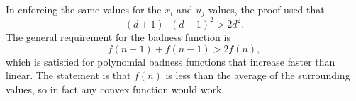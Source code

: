 In enforcing the same values for the $x_i$ and $u_j$ values, the proof
used that
\[ (d+1)^+(d-1)^2>2d^2. \]
The general requirement for the badness function is
\[ f(n+1)+f(n-1)>2f(n), \]
which is satisfied for polynomial badness functions that increase
faster than linear. The statement is that $f(n)$ is less than the
average of the surrounding values, so in fact any convex function
would work.
